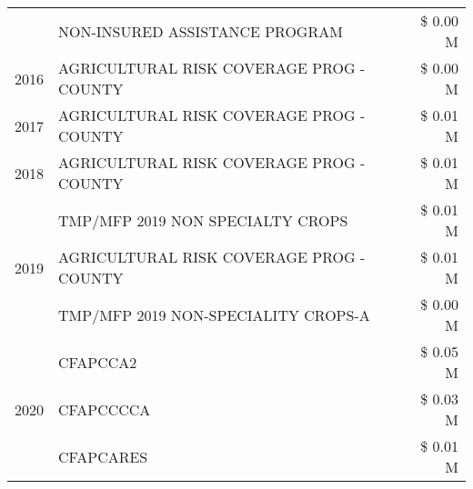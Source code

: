 \begin{tabular}{llr}
 & NON-INSURED ASSISTANCE PROGRAM & \$ 0.00 M \\
\cline{1-3}
2016 & AGRICULTURAL RISK COVERAGE PROG - COUNTY & \$ 0.00 M \\
\cline{1-3}
2017 & AGRICULTURAL RISK COVERAGE PROG - COUNTY & \$ 0.01 M \\
\cline{1-3}
2018 & AGRICULTURAL RISK COVERAGE PROG - COUNTY & \$ 0.01 M \\
\cline{1-3}
\multirow[t]{3}{*}{2019} & TMP/MFP 2019 NON SPECIALTY CROPS & \$ 0.01 M \\
 & AGRICULTURAL RISK COVERAGE PROG - COUNTY & \$ 0.01 M \\
 & TMP/MFP 2019 NON-SPECIALITY CROPS-A & \$ 0.00 M \\
\cline{1-3}
\multirow[t]{3}{*}{2020} & CFAPCCA2 & \$ 0.05 M \\
 & CFAPCCCCA & \$ 0.03 M \\
 & CFAPCARES & \$ 0.01 M \\
\cline{1-3}
\bottomrule
\end{tabular}
